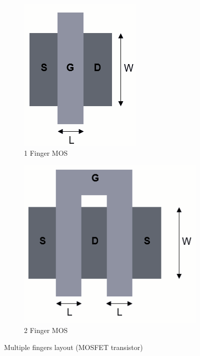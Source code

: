 \documentclass[a4paper,12pt]{article}
\begin{document}
	\begin{figure}[H]
		\centering
		\begin{subfigure}[t]{0.49\textwidth}
			\centering
			\includegraphics[width=.75\linewidth]{images/9.2}
			\caption{1 Finger MOS}
		\end{subfigure}
		\hfill
		\begin{subfigure}[t]{0.49\textwidth}
			\centering
			\includegraphics[width=1\linewidth]{images/10.3}
			\caption{2 Finger MOS}
		\end{subfigure}

	\caption{Multiple fingers layout (MOSFET transistor)}
	\label{fig:9}
\end{figure}
\end{document}
